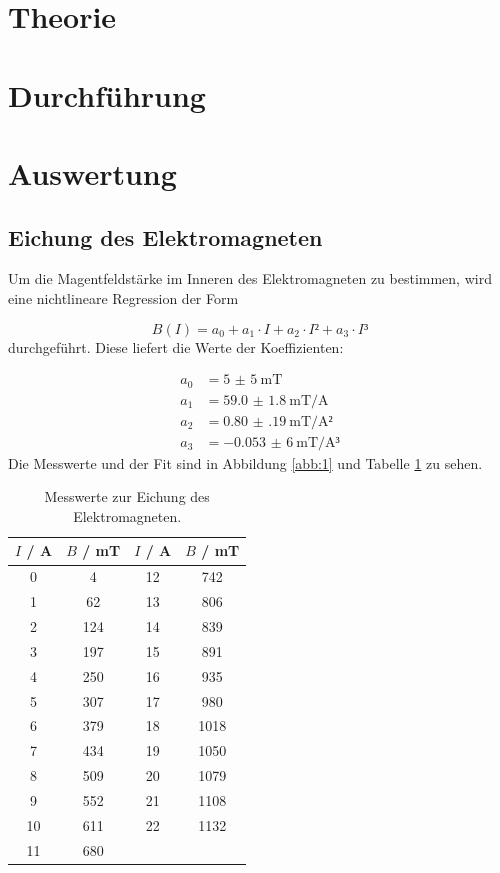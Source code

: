 \section{Theorie}

\section{Durchführung}
\section{Auswertung}


\subsection{Eichung des Elektromagneten}
Um die Magentfeldstärke im Inneren des Elektromagneten zu bestimmen, wird eine nichtlineare Regression der Form

\begin{equation}
  B(I) = a_0 + a_1 \cdot I + a_2 \cdot I² + a_3 \cdot I³
  \label{eq:B}
\end{equation}
durchgeführt. Diese liefert die Werte der Koeffizienten:

\begin{align*}
  a_0 &= \SI{5(5)}{\milli\tesla} \\
  a_1 &= \SI{59.0(18)}{\milli\tesla\per\ampere} \\
  a_2 &= \SI{0.80(19)}{\milli\tesla\per\ampere²} \\
  a_3 &= \SI{-0,053(6)}{\milli\tesla\per\ampere³}
\end{align*}
Die Messwerte und der Fit sind in Abbildung \ref{abb:1} und Tabelle \ref{tab:1} zu sehen.

\begin{table}
  \centering
  \caption{Messwerte zur Eichung des Elektromagneten.}
  \label{tab:1}
  \begin{tabular}{c c | c c}
    \toprule
    $I$ / \si{\ampere} & $B$ / \si{\milli\tesla} & $I$ / \si{\ampere} & $B$ / \si{\milli\tesla} \\
    \midrule
    0 & 4  & 12 & 742 \\
    1 & 62 & 13 & 806 \\
    2 & 124 & 14 & 839 \\
    3 & 197 & 15 & 891 \\
    4 & 250 & 16 & 935 \\
    5 & 307 & 17 & 980 \\
    6 & 379 & 18 & 1018 \\
    7 & 434 & 19 & 1050 \\
    8 & 509 & 20 & 1079 \\
    9 & 552 & 21 & 1108 \\
    10 & 611& 22 & 1132 \\
    11 & 680 \\
    \bottomrule
  \end{tabular}
\end{table}

